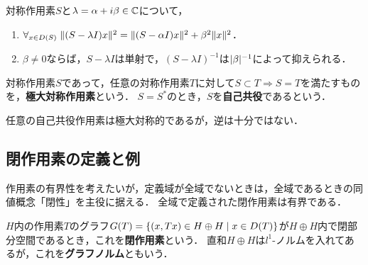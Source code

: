 \documentclass[uplatex,dvipdfmx]{jsreport}
\begin{document}
\begin{lemma}
    対称作用素$S$と$\lambda=\alpha+i\beta\in\mathbb{C}$について，
    \begin{enumerate}
        \item $\forall_{x\in D(S)}\;\|(S-\lambda I)x\|^2=\|(S-\alpha I)x\|^2+\beta^2\|x\|^2$．
        \item $\beta\ne0$ならば，$S-\lambda I$は単射で，$(S-\lambda I)^{-1}$は$\lvert\beta\rvert^{-1}$によって抑えられる．
    \end{enumerate}
\end{lemma}

\begin{definition}
    対称作用素$S$であって，任意の対称作用素$T$に対して$S\subset T\Rightarrow S=T$を満たすものを，\textbf{極大対称作用素}という．
    $S=S^*$のとき，$S$を\textbf{自己共役}であるという．
\end{definition}

\begin{lemma}
    任意の自己共役作用素は極大対称的であるが，逆は十分ではない．
\end{lemma}

\subsection{閉作用素の定義と例}

\begin{tcolorbox}[colframe=ForestGreen, colback=ForestGreen!10!white,breakable,colbacktitle=ForestGreen!40!white,coltitle=black,fonttitle=\bfseries\sffamily,
title=]
    作用素の有界性を考えたいが，定義域が全域でないときは，全域であるときの同値概念「閉性」を主役に据える．
    全域で定義された閉作用素は有界である．
\end{tcolorbox}

\begin{definition}
    $H$内の作用素$T$のグラフ$G(T)=\left\{(x,Tx)\in H\oplus H\mid x\in D(T)\right\}$が$H\oplus H$内で閉部分空間であるとき，これを\textbf{閉作用素}という．
    直和$H\oplus H$は$l^1$-ノルムを入れてあるが，これを\textbf{グラフノルム}ともいう．
\end{definition}
\end{document}
